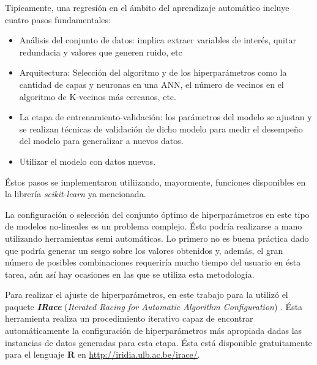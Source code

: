     \par Tipicamente, una regresión en el ámbito del aprendizaje automático
      incluye cuatro pasos fundamentales:
      \begin{itemize}
        \item Análisis del conjunto de datos: implica extraer variables de interés, quitar redundacia y valores que generen
              ruido, etc
        \item Arquitectura: Selección del algoritmo y de los hiperparámetros como
              la cantidad de capas y neuronas en una ANN, el número de vecinos en
              el algoritmo de K-vecinos más cercanos, etc.
        \item La etapa de entrenamiento-validación: los parámetros del modelo
              se ajustan y se realizan técnicas de validación de dicho modelo para
              medir el desempeño del modelo para generalizar a nuevos datos.
        \item Utilizar el modelo con datos nuevos.
      \end{itemize}
      Éstos pasos se implementaron utiliizando, mayormente, funciones disponibles
      en la librería \textit{scikit-learn} ya mencionada.

    \par La configuración o selección del conjunto óptimo de hiperparámetros
      en este tipo de modelos no-lineales es un problema complejo. Ésto
      podría realizarse a mano utilizando herramientas semi automáticas. Lo primero
      no es buena práctica dado que podría generar un sesgo sobre los valores
      obtenidos y, además, el gran número de posibles combinaciones requeriría
      mucho tiempo del usuario en ésta tarea, aún así hay ocasiones en las
      que se utiliza esta metodología.

    \par Para realizar el ajuste de hiperparámetros, en este trabajo para la
      utilizó el paquete \textbf{\textit{IRace}}
      (\textit{Iterated Racing for Automatic Algorithm Configuration}) \cite{irace}.
      Ésta herramienta realiza un procedimiento iterativo capaz de encontrar
      automáticamente la configuración de hiperparámetros más apropiada
      dadas las instancias de datos generadas para esta etapa.
      Ésta está disponible gratuitamente para el lenguaje \textbf{R} en
      \url{http://iridia.ulb.ac.be/irace/}.

